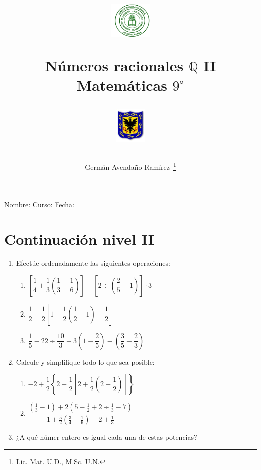 \documentclass[twoside]{article}
\author{Germ\'an Avenda\~no Ram\'irez~\thanks{Lic. Mat. U.D., M.Sc. U.N.}}
\title{\begin{minipage}{.2\textwidth}
\includegraphics[height=1.75cm]{Images/logo-colegio.png}\end{minipage}
\begin{minipage}{.55\textwidth}
\begin{center}
Números racionales $\mathbb{Q}$ II\\
Matemáticas $9^{\circ}$
\end{center}
\end{minipage}\hfill
\begin{minipage}{.2\textwidth}
\includegraphics[height=1.75cm]{Images/logo-sed.png} 
\end{minipage}}
\date{}
\begin{document}
\maketitle
Nombre: \hrulefill Curso: \underline{\hspace*{44pt}} Fecha: \underline{\hspace*{2.5cm}}
\section*{Continuación nivel II}
\begin{enumerate}
\item Efectúe ordenadamente las siguientes operaciones:
\begin{enumerate}
\item $\left[\dfrac{1}{4}+\dfrac{1}{3}\left(\dfrac{1}{3}-\dfrac{1}{6}\right)\right]-\left[2\div \left(\dfrac{2}{5}+1\right)\right]\cdot 3$
\item $\dfrac{1}{2}-\dfrac{1}{2}\left[1+\dfrac{1}{2}\left(\dfrac{1}{2}-1\right)-\dfrac{1}{2}\right]$
\item $\dfrac{1}{5}-22\div \dfrac{10}{3}+3\left(1-\dfrac{2}{5}\right)-\left(\dfrac{3}{5}-\dfrac{2}{3}\right)$
\end{enumerate}
\item Calcule y simplifique todo lo que sea posible:
\begin{enumerate}
\item $-2+\dfrac{1}{2}\left\{2+\dfrac{1}{2}\left[2+\dfrac{1}{2}\left(2+\dfrac{1}{2}\right)\right]\right\}$
\item $\dfrac{\left(\frac{1}{3}-1\right)+2\left(5-\frac{1}{2}+2\div \frac{1}{3}-7\right)}{1+\frac{5}{2}\left(\frac{3}{4}-\frac{1}{6}\right)-2+\frac{1}{3}}$
\end{enumerate}
\item ¿A qué númer entero es igual cada una de estas potencias?
\begin{enumerate}
\end{enumerate}
\end{enumerate}
\end{document}
